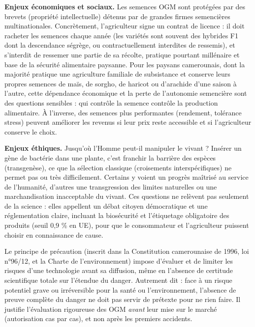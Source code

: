 \documentclass[11pt]{article}
\newcommand{\cle}[1]{{\popxbold\color{popdark}#1}}
\newcounter{popsec}
\newcounter{popsub}
\newcommand{\courssub}[1]{%
  \stepcounter{popsub}%
  \par\vspace{9pt}\noindent{\popxbold\fontsize{11.5}{13}\selectfont\color{popink}{\color{poporange}\thepopsec.\thepopsub}\hspace{6pt}#1}\par\nopagebreak\vspace{4pt}
}
\begin{document}
\courssub{Les enjeux économiques, sociaux et éthiques}

\textbf{Enjeux économiques et sociaux.} Les semences OGM sont protégées par des \cle{brevets} (propriété intellectuelle) détenus par de grandes firmes semencières multinationales. Concrètement, l'agriculteur signe un contrat de licence : il doit racheter les semences chaque année (les variétés sont souvent des hybrides F1 dont la descendance ségrège, ou contractuellement interdites de ressemis), et s'interdit de ressemer une partie de sa récolte, pratique pourtant millénaire et base de la sécurité alimentaire paysanne. Pour les paysans camerounais, dont la majorité pratique une agriculture familiale de subsistance et conserve leurs propres semences de maïs, de sorgho, de haricot ou d'arachide d'une saison à l'autre, cette dépendance économique et la perte de l'autonomie semencière sont des questions sensibles : qui contrôle la semence contrôle la production alimentaire. À l'inverse, des semences plus performantes (rendement, tolérance stress) peuvent améliorer les revenus si leur prix reste accessible et si l'agriculteur conserve le choix.

\textbf{Enjeux éthiques.} Jusqu'où l'Homme peut-il manipuler le vivant ? Insérer un gène de bactérie dans une plante, c'est franchir la barrière des espèces (transgenèse), ce que la sélection classique (croisements interspécifiques) ne permet pas ou très difficilement. Certains y voient un progrès maîtrisé au service de l'humanité, d'autres une transgression des limites naturelles ou une marchandisation inacceptable du vivant. Ces questions ne relèvent pas seulement de la science : elles appellent un débat citoyen démocratique et une réglementation claire, incluant la \cle{biosécurité} et l'\cle{étiquetage} obligatoire des produits (seuil 0,9 \% en UE), pour que le consommateur et l'agriculteur puissent choisir en connaissance de cause.

\begin{definition}
Le \cle{principe de précaution} (inscrit dans la Constitution camerounaise de 1996, loi n°96/12, et la Charte de l'environnement) impose d'évaluer et de limiter les risques d'une technologie avant sa diffusion, même en l'absence de certitude scientifique totale sur l'étendue du danger. Autrement dit : face à un risque potentiel grave ou irréversible pour la santé ou l'environnement, l'absence de preuve complète du danger ne doit pas servir de prétexte pour ne rien faire. Il justifie l'évaluation rigoureuse des OGM \emph{avant} leur mise sur le marché (autorisation cas par cas), et non après les premiers accidents.
\end{definition}
\end{document}
